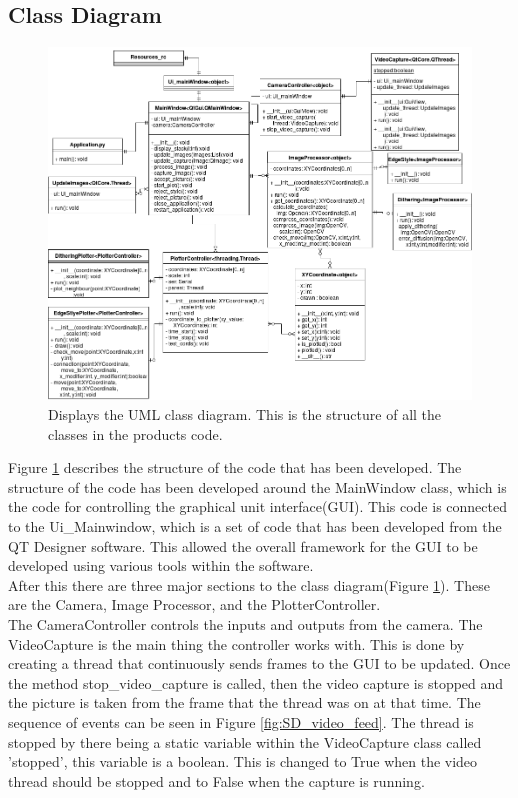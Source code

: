 \documentclass{article}
\begin{document}
\subsection{Class Diagram} 
\begin{figure}[h]
    \centering
    \includegraphics[width=1\textwidth]{class_diagram.png}
    \caption{Displays the UML class diagram. This is the structure of all the classes in the products code.}
    \label{fig:class_diagram}
\end{figure}
Figure \ref{fig:class_diagram} describes the structure of the code that has been developed. The structure of the code has been developed around the MainWindow class, which is the code for controlling the graphical unit interface(GUI). This code is connected to the Ui\_Mainwindow, which is a set of code that has been developed from the QT Designer software\cite{qt_designer}. This allowed the overall framework for the GUI to be developed using various tools within the software.\\ \newline
After this there are three major sections to the class diagram(Figure \ref{fig:class_diagram}). These are the Camera, Image Processor, and the PlotterController.
\\ \newline
The CameraController controls the inputs and outputs from the camera. The VideoCapture is the main thing the controller works with. This is done by creating a thread that continuously sends frames to the GUI to be updated. Once the method stop\_video\_capture is called, then the video capture is stopped and the picture is taken from the frame that the thread was on at that time. The sequence of events can be seen in Figure \ref{fig:SD_video_feed}. The thread is stopped by there being a static variable within the VideoCapture class called 'stopped', this variable is a boolean. This is changed to True when the video thread should be stopped and to False when the capture is running. \\ \newline
\end{document}
